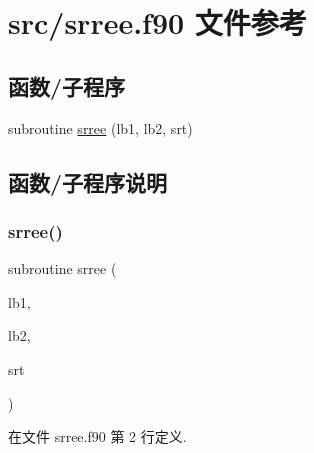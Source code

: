 \hypertarget{srree_8f90}{}\section{src/srree.f90 文件参考}
\label{srree_8f90}
\subsection*{函数/子程序}
\begin{DoxyCompactItemize}
\item 
subroutine \mbox{\hyperlink{srree_8f90_ac4135dd8570d022e350bf9755917de91}{srree}} (lb1, lb2, srt)
\end{DoxyCompactItemize}


\subsection{函数/子程序说明}
\mbox{\label{srree_8f90_ac4135dd8570d022e350bf9755917de91}} 
\subsubsection{\texorpdfstring{srree()}{srree()}}
{\footnotesize\ttfamily subroutine srree (\begin{DoxyParamCaption}\item[{}]{lb1,  }\item[{}]{lb2,  }\item[{}]{srt }\end{DoxyParamCaption})}



在文件 srree.\+f90 第 2 行定义.

